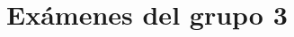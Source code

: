 \documentclass[a4paper,12pt,twoside]{book}
\begin{document}
    
\chapter{Exámenes del grupo 3}
\end{document}
